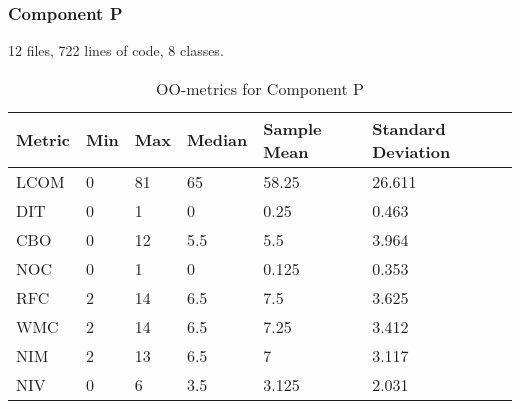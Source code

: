 \subsubsection{Component P}
12 files, 722 lines of code, 8 classes.
\begin{table}[]
\centering
\caption{OO-metrics for Component P}
\label{tab:oometrics-proc}
\begin{tabular}{|l|l|l|l|l|l|}
\hline
\textbf{Metric} & \textbf{Min} & \textbf{Max} & \textbf{Median} & \textbf{Sample Mean} & \textbf{Standard Deviation} \\ \hline
LCOM            & 0            & 81           & 65              & 58.25                & 26.611                      \\ \hline
DIT             & 0            & 1            & 0               & 0.25                 & 0.463                       \\ \hline
CBO             & 0            & 12           & 5.5             & 5.5                  & 3.964                       \\ \hline
NOC             & 0            & 1            & 0               & 0.125                & 0.353                       \\ \hline
RFC             & 2            & 14           & 6.5             & 7.5                  & 3.625                       \\ \hline
WMC             & 2            & 14           & 6.5             & 7.25                 & 3.412                       \\ \hline
NIM             & 2            & 13           & 6.5             & 7                    & 3.117                       \\ \hline
NIV             & 0            & 6            & 3.5             & 3.125                & 2.031                       \\ \hline
\end{tabular}
\end{table}





